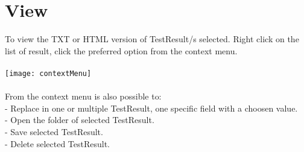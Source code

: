 \chapter{View}

To view the TXT or HTML version of TestResult/s selected. Right click on the list of result, click the preferred option from the context menu.
\\\\
\texttt{[image: contextMenu]}
\\\\
From the context menu is also possible to:\\
- Replace in one or multiple TestResult, one specific field with a choosen value.\\
- Open the folder of selected TestResult.\\
- Save selected TestResult.\\
- Delete selected TestResult.\\

\clearpage